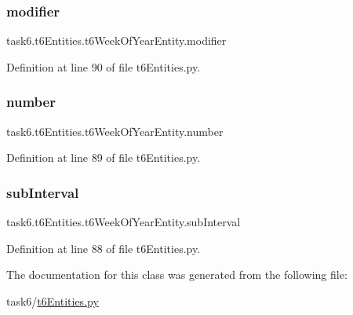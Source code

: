 \subsubsection{\texorpdfstring{modifier}{modifier}}
{\footnotesize\ttfamily task6.\+t6\+Entities.\+t6\+Week\+Of\+Year\+Entity.\+modifier}



Definition at line 90 of file t6\+Entities.\+py.

\mbox{\label{classtask6_1_1t6Entities_1_1t6WeekOfYearEntity_ac5530a69a336579c3f12f2530d68bf21}} 
\subsubsection{\texorpdfstring{number}{number}}
{\footnotesize\ttfamily task6.\+t6\+Entities.\+t6\+Week\+Of\+Year\+Entity.\+number}



Definition at line 89 of file t6\+Entities.\+py.

\mbox{\label{classtask6_1_1t6Entities_1_1t6WeekOfYearEntity_a6e216a0eeb8e1e9f8b8a7f30fdfff618}} 
\subsubsection{\texorpdfstring{sub\+Interval}{subInterval}}
{\footnotesize\ttfamily task6.\+t6\+Entities.\+t6\+Week\+Of\+Year\+Entity.\+sub\+Interval}



Definition at line 88 of file t6\+Entities.\+py.



The documentation for this class was generated from the following file\+:\begin{DoxyCompactItemize}
\item 
task6/\hyperlink{t6Entities_8py}{t6\+Entities.\+py}\end{DoxyCompactItemize}
